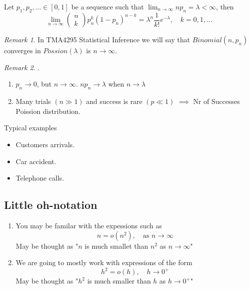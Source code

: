 \documentclass{article}
\theoremstyle{remark}
\newtheorem*{remark}{Remark}
\begin{document}
\begin{theorem}
  Let $p_{1}, p_{2}, \ldots \in  \left[ 0,1 \right]$ be a sequence such that $\lim_{n \to  \infty} n p_{n} = \lambda  < \infty $, then \[
  \lim_{n\to \infty}  \begin{pmatrix}
  n \\
  k
  \end{pmatrix}
  p^{k}_{n} \left( 1-p_{n} \right) ^{n-k} = \lambda ^{n} \frac{1}{k!}  e^{-\lambda } , \quad  k=0,1 , \ldots
  \]
\end{theorem}
\begin{remark}
  In TMA4295 Statistical Inference we will say that $Binomial\left( n, p_{n} \right)$ converges in $Possion\left( \lambda  \right)$ is $n\to \infty$.
\end{remark}

\begin{remark}
  .
  \begin{enumerate}[label=(\roman*)]
    \item $p_{n } \to  0$, but $n\to \infty$. $np_{n} \to  \lambda $ when $n\to \lambda $
    \item Many trials $\left( n\gg 1 \right) $ and success is rare $\left( p \ll  1 \right)$ $\implies$  Nr of Successes Poission distribution.
  \end{enumerate}
\end{remark}

Typical examples
\begin{itemize}
  \item Customers arrivals.
  \item Car accident.
  \item Telephone calls.
\end{itemize}


\subsection{Little oh-notation}%

\label{sub:little_oh_notation}


\begin{enumerate}[label=(\roman*)]
  \item
You may be familar with the expessions such as \[
n = o\left( n^2 \right), \quad \text{as } n\to \infty
\]
May be thought as  "$n$ is much smallet than $n^2$ as $n\to  \infty$"
\item
We are going to mostly work with expressions of the form \[
h^2 = o\left( h \right) , \quad  h \to  0^{+}
\]
May be thought as "$h^2$ is much smaller than $h$ as $h \to  0^{+}$"

\end{enumerate}
\end{document}
